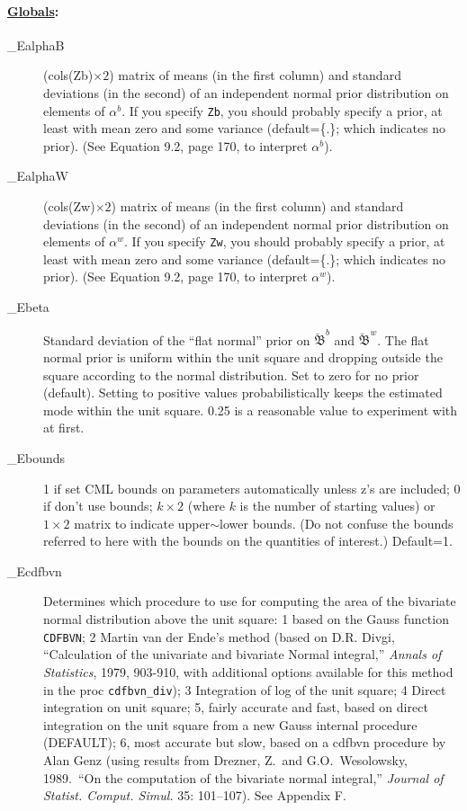 \documentclass[11pt,titlepage]{article}
\newcommand{\bbetau}{\breve{\mathfrak B}}
\begin{document}
\paragraph{\underline{Globals}:}
\begin{description}
\item[\_EalphaB] (cols(Zb)$\times 2$) matrix of means (in the first
  column) and standard deviations (in the second) of an independent
  normal prior distribution on elements of $\alpha^b$.  If you specify
  \texttt{Zb}, you should probably specify a prior, at least with mean
  zero and some variance (default=\{.\}; which indicates no prior).
  (See Equation 9.2, page 170, to interpret $\alpha^b$).

\item[\_EalphaW] (cols(Zw)$\times 2$) matrix of means (in the first
  column) and standard deviations (in the second) of an independent
  normal prior distribution on elements of $\alpha^w$.  If you specify
  \texttt{Zw}, you should probably specify a prior, at least with mean
  zero and some variance (default=\{.\}; which indicates no prior).
  (See Equation 9.2, page 170, to interpret $\alpha^w$).

\item[\_Ebeta] Standard deviation of the ``flat normal'' prior on
  $\bbetau^b$ and $\bbetau^w$.  The flat normal prior is uniform
  within the unit square and dropping outside the square according to
  the normal distribution.  Set to zero for no prior (default).
  Setting to positive values probabilistically keeps the estimated
  mode within the unit square.  0.25 is a reasonable value to
  experiment with at first.

\item[\_Ebounds] 1 if set CML bounds on parameters automatically
  unless z's are included; 0 if don't use bounds; $k\times 2$ (where
  $k$ is the number of starting values) or $1\times 2$ matrix to
  indicate upper$\sim$lower bounds. (Do not confuse the bounds
  referred to here with the bounds on the quantities of interest.)
  Default=1.

\item[\_Ecdfbvn] Determines which procedure to use for computing the
  area of the bivariate normal distribution above the unit square: 1
  based on the Gauss function \texttt{CDFBVN}; 2 Martin van der Ende's
  method (based on D.R. Divgi, ``Calculation of the univariate and
  bivariate Normal integral,'' \emph{Annals of Statistics}, 1979,
  903-910, with additional options available for this method in the
  proc \texttt{cdfbvn\_div}); 3 Integration of log of the unit square;
  4 Direct integration on unit square; 5, fairly accurate and fast,
  based on direct integration on the unit square from a new Gauss
  internal procedure (DEFAULT); 6, most accurate but slow, based on a
  cdfbvn procedure by Alan Genz (using results from Drezner, Z.\ and
  G.O.\ Wesolowsky, 1989.\ ``On the computation of the bivariate
  normal integral,'' \emph{Journal of Statist. Comput. Simul.} 35:
  101--107).  See Appendix F.


\end{description}
\end{document}
